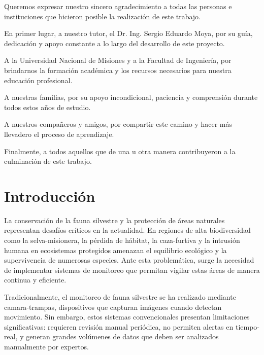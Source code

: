\documentclass[a4paper, 12pt]{report}
\renewcommand{\lstlistlistingname}{Índice de códigos fuente}
\begin{document}
Queremos expresar nuestro sincero agradecimiento a todas las personas e instituciones
que hicieron posible la realización de este trabajo.

En primer lugar, a nuestro tutor, el Dr. Ing. Sergio Eduardo Moya, por su guía,
dedicación y apoyo constante a lo largo del desarrollo de este proyecto.

A la Universidad Nacional de Misiones y a la Facultad de Ingeniería, por brindarnos
la formación académica y los recursos necesarios para nuestra educación profesional.

A nuestras familias, por su apoyo incondicional, paciencia y comprensión durante
todos estos años de estudio.

A nuestros compañeros y amigos, por compartir este camino y hacer más llevadero
el proceso de aprendizaje.

Finalmente, a todos aquellos que de una u otra manera contribuyeron a la
culminación de este trabajo.

\tableofcontents

\listoffigures

\listoftables

\lstlistoflistings
\addcontentsline{toc}{chapter}{\lstlistlistingname}

\printnoidxglossary[type=main]
\printnoidxglossary[type=\acronymtype]

\chapter{Introducción}

La conservación de la fauna silvestre y la protección de áreas naturales
representan desafíos críticos en la actualidad. En regiones de alta
biodiversidad como la \gls{selva-misionera}, la pérdida de hábitat,
la \gls{caza-furtiva} y la intrusión humana en ecosistemas protegidos amenazan
el equilibrio ecológico y la supervivencia de numerosas especies. Ante
esta problemática, surge la necesidad de implementar sistemas de monitoreo
que permitan vigilar estas áreas de manera continua y eficiente.

Tradicionalmente, el monitoreo de fauna silvestre se ha realizado mediante
\glspl{camara-trampa}, dispositivos que capturan imágenes cuando detectan
movimiento. Sin embargo, estos sistemas convencionales presentan limitaciones
significativas: requieren revisión manual periódica, no permiten alertas
en \gls{tiempo-real}, y generan grandes volúmenes de datos que deben ser
analizados manualmente por expertos.
\end{document}
